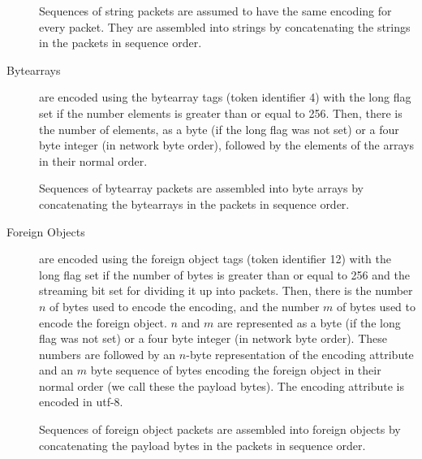 \documentclass{report}
\def\acronym#1{\textsf{#1}}
\begin{document}
\begin{description}
    Sequences of string packets are assumed to have the same encoding for every
    packet. They are assembled into strings by concatenating the strings in the packets in
    sequence order.
  \item[Bytearrays] are encoded using the bytearray tags (token identifier 4) with the
    long flag set if the number elements is greater than or equal to 256. Then, there is
    the number of elements, as a byte (if the long flag was not set) or a four byte
    integer (in network byte order), followed by the elements of the arrays in their
    normal order.

    Sequences of bytearray packets are assembled into byte arrays by concatenating the
    bytearrays in the packets in sequence order.
  \item[Foreign Objects] are encoded using the foreign object tags (token identifier 12)
    with the long flag set if the number of bytes is greater than or equal to 256 and the
    streaming bit set for dividing it up into packets. Then, there is the number
    $n$ of bytes used to encode the encoding, and the number
    $m$ of bytes used to encode the foreign
    object. $n$ and $m$ are represented as a byte
    (if the long flag was not set) or a four byte integer (in network byte order). These
    numbers are followed by an $n$-byte representation of the encoding
    attribute and an $m$ byte sequence of bytes encoding the foreign
    object in their normal order (we call these the payload bytes). The encoding attribute
    is encoded in \acronym{utf-8}.

    Sequences of foreign object packets are assembled into foreign objects by
    concatenating the payload bytes in the packets in sequence order.


\end{description}
\end{document}
